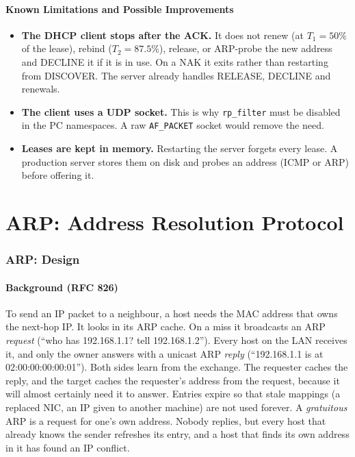 \documentclass[11pt]{article}
\begin{document}
\subsection{Known Limitations and Possible Improvements}
\begin{itemize}[leftmargin=1.6em]
  \item \textbf{The DHCP client stops after the ACK.} It does not renew (at $T_1=50\%$ of
  the lease), rebind ($T_2=87.5\%$), release, or ARP-probe the new address and DECLINE it
  if it is in use. On a NAK it exits rather than restarting from DISCOVER. The server
  already handles RELEASE, DECLINE and renewals.
  \item \textbf{The client uses a UDP socket.} This is why \texttt{rp\_filter} must be
  disabled in the PC namespaces. A raw \texttt{AF\_PACKET} socket would remove the need.
  \item \textbf{Leases are kept in memory.} Restarting the server forgets every lease. A
  production server stores them on disk and probes an address (ICMP or ARP) before
  offering it.
\end{itemize}


\part{ARP: Address Resolution Protocol}

\section{ARP: Design}

\subsection{Background (RFC 826)}
To send an IP packet to a neighbour, a host needs the MAC address that owns the next-hop
IP. It looks in its ARP cache. On a miss it broadcasts an ARP \emph{request} (``who has
192.168.1.1? tell 192.168.1.2''). Every host on the LAN receives it, and only the owner
answers with a unicast ARP \emph{reply} (``192.168.1.1 is at 02:00:00:00:00:01''). Both
sides learn from the exchange. The requester caches the reply, and the target caches the
requester's address from the request, because it will almost certainly need it to answer.
Entries expire so that stale mappings (a replaced NIC, an IP given to another machine) are
not used forever. A \emph{gratuitous} ARP is a request for one's own address. Nobody
replies, but every host that already knows the sender refreshes its entry, and a host
that finds its own address in it has found an IP conflict.
\end{document}
